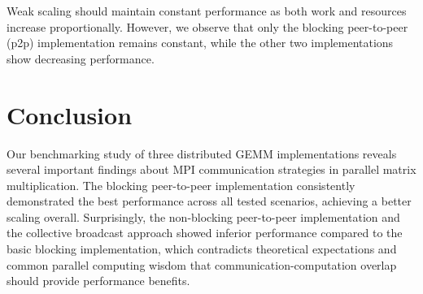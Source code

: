 \documentclass[12pt,a4paper]{article}
\begin{document}
Weak scaling should maintain constant performance as both work and resources increase proportionally.
However, we observe that only the blocking peer-to-peer (p2p) implementation remains constant, while the other two implementations show decreasing performance.



\section{Conclusion}

Our benchmarking study of three distributed GEMM implementations reveals several important findings about MPI communication strategies in parallel matrix multiplication.
The blocking peer-to-peer implementation consistently demonstrated the best performance across all tested scenarios, achieving a better scaling overall.
Surprisingly, the non-blocking peer-to-peer implementation and the collective broadcast approach showed inferior performance compared to the basic blocking implementation, which contradicts theoretical expectations and common parallel computing wisdom that communication-computation overlap should provide performance benefits.
\end{document}
